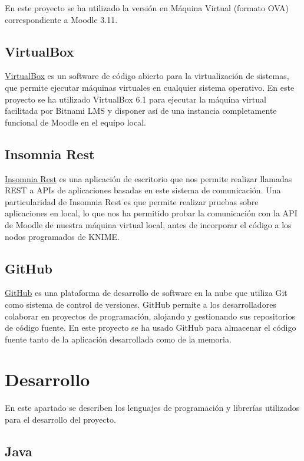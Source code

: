 En este proyecto se ha utilizado la versión en Máquina Virtual (formato OVA) correspondiente a Moodle 3.11. 
\

\subsection{VirtualBox}

\href{https://www.virtualbox.org/}{VirtualBox} es un software de código abierto para la virtualización de sistemas, que permite ejecutar máquinas 
virtuales en cualquier sistema operativo. En este proyecto se ha utilizado VirtualBox 6.1 para ejecutar la máquina virtual 
facilitada por Bitnami LMS y disponer así de una instancia completamente funcional de Moodle en el equipo local. 


\subsection{Insomnia Rest}

\href{https://insomnia.rest/}{Insomnia Rest} es una aplicación de escritorio que nos permite realizar llamadas REST a APIs de
 aplicaciones basadas en este sistema de comunicación. Una particularidad de Insomnia Rest es que permite realizar 
 pruebas sobre aplicaciones en local, lo que nos ha permitido probar la comunicación con 
 la API de Moodle de nuestra máquina virtual local, antes de incorporar el código a los nodos programados de KNIME.

\subsection{GitHub}

\href{https://github.com/}{GitHub} es una plataforma de desarrollo de software en la nube que utiliza Git como sistema de control 
de versiones. GitHub permite a los desarrolladores colaborar en proyectos de programación, alojando y gestionando sus repositorios de 
código fuente. En este proyecto se ha usado GitHub para almacenar el código fuente tanto de la aplicación desarrollada como de la memoria. 

\newpage
\section{Desarrollo}

En este apartado se describen los lenguajes de programación y librerías utilizados para el desarrollo del proyecto. 

\subsection{Java}

